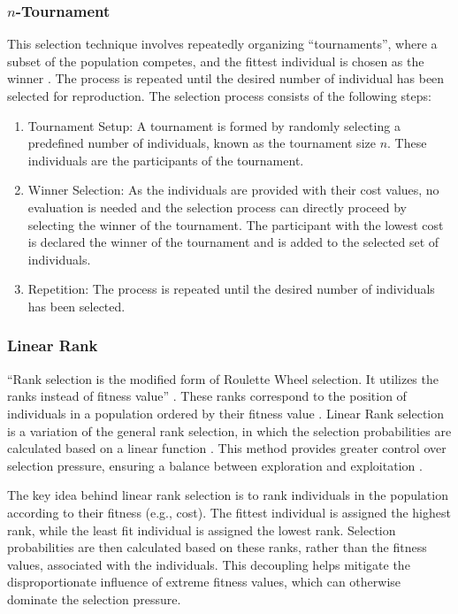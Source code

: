 \documentclass[english,examples]{isasthesis}
\begin{document}
\subsubsection{$n$-Tournament}
This selection technique involves repeatedly organizing \enquote{tournaments},
where a subset of the population competes, and the fittest individual is chosen
as the winner \cite{Affenzeller2009}.
The process is repeated until the desired number of individual has been
selected for reproduction. The selection process consists of the following
steps:
\begin{enumerate}
    \item   Tournament Setup: A tournament is formed by randomly selecting
            a predefined number of individuals, known as the tournament size
            $n$. These individuals are the participants of the tournament.
    \item   Winner Selection: As the individuals are provided with their cost
            values, no evaluation is needed and the selection process can
            directly proceed by selecting the winner of the tournament.
            The participant with the lowest cost is declared the winner of the
            tournament and is added to the selected set of individuals.
    \item   Repetition: The process is repeated until the desired number of
            individuals has been selected.
\end{enumerate}

\subsubsection{Linear Rank}
\enquote{Rank selection is the modified form of Roulette Wheel selection.
It utilizes the ranks instead of fitness value} \cite{Katoch2021}.
These ranks correspond to the position of individuals in a population ordered
by their fitness value \cite{Affenzeller2009}.
Linear Rank selection is a variation of the general rank selection, in which
the selection probabilities are calculated based on a linear function
\cite{Affenzeller2009}.
This method provides greater control over selection pressure, ensuring a
balance between exploration and exploitation \cite{Katoch2021,Affenzeller2009}.

The key idea behind linear rank selection is to rank individuals in the
population according to their fitness (e.g., cost). The fittest individual is
assigned the highest rank, while the least fit individual is assigned the
lowest rank. Selection probabilities are then calculated based on these ranks,
rather than the fitness values, associated with the individuals.
This decoupling helps mitigate the disproportionate influence of extreme
fitness values, which can otherwise dominate the selection pressure.
\end{document}
